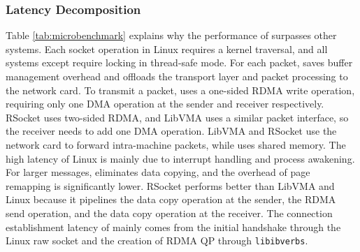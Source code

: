 \subsubsection{Latency Decomposition}

Table \ref{tab:microbenchmark} explains why the performance of \sys{} surpasses other systems. Each socket operation in Linux requires a kernel traversal, and all systems except \sys{} require locking in thread-safe mode. For each packet, \sys{} saves buffer management overhead and offloads the transport layer and packet processing to the network card. To transmit a packet, \sys{} uses a one-sided RDMA write operation, requiring only one DMA operation at the sender and receiver respectively. RSocket uses two-sided RDMA, and LibVMA uses a similar packet interface, so the receiver needs to add one DMA operation. LibVMA and RSocket use the network card to forward intra-machine packets, while \sys{} uses shared memory. The high latency of Linux is mainly due to interrupt handling and process awakening. For larger messages, \sys{} eliminates data copying, and the overhead of page remapping is significantly lower. RSocket performs better than LibVMA and Linux because it pipelines the data copy operation at the sender, the RDMA send operation, and the data copy operation at the receiver. The connection establishment latency of \sys{} mainly comes from the initial handshake through the Linux raw socket and the creation of RDMA QP through \texttt{libibverbs}.

